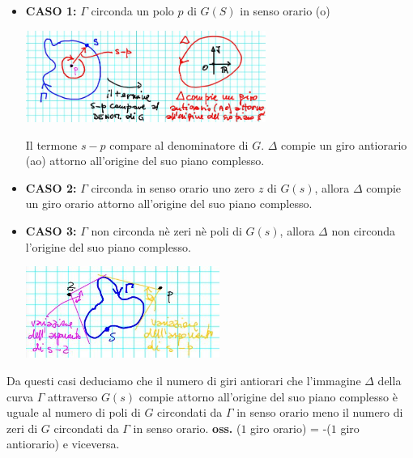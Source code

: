 \begin{itemize}
    \item \textbf{CASO 1:}\newline
    $\Gamma$ circonda un polo $p$ di $G(S)$ in senso orario (o)
    \begin{center}
        \includegraphics[height=3cm]{../lezione19/img2.JPG}
    \end{center}
    Il termone $s-p$ compare al denominatore di $G$. $\Delta$ compie un giro antiorario (ao) attorno all'origine del suo piano complesso.
    \item \textbf{CASO 2:}\newline
    $\Gamma$ circonda in senso orario uno zero $z$ di $G(s)$, allora $\Delta$ compie un giro orario attorno all'origine del suo piano complesso.
    \item \textbf{CASO 3:}\newline
    $\Gamma$ non circonda nè zeri nè poli di $G(s)$, allora $\Delta$ non circonda l'origine del suo piano complesso.
    \begin{center}
        \includegraphics[height=3cm]{../lezione19/img3.JPG}
    \end{center}
\end{itemize}
Da questi casi deduciamo che il numero di giri antiorari che l'immagine $\Delta$ della curva $\Gamma$ attraverso $G(s)$ compie attorno all'origine del suo piano complesso è uguale al numero di poli di $G$ circondati da $\Gamma$ in senso orario meno il numero di zeri di $G$ circondati da $\Gamma$ in senso orario.\newline
\newline
\textbf{oss.} ($1$ giro orario) = -($1$ giro antiorario) e viceversa.